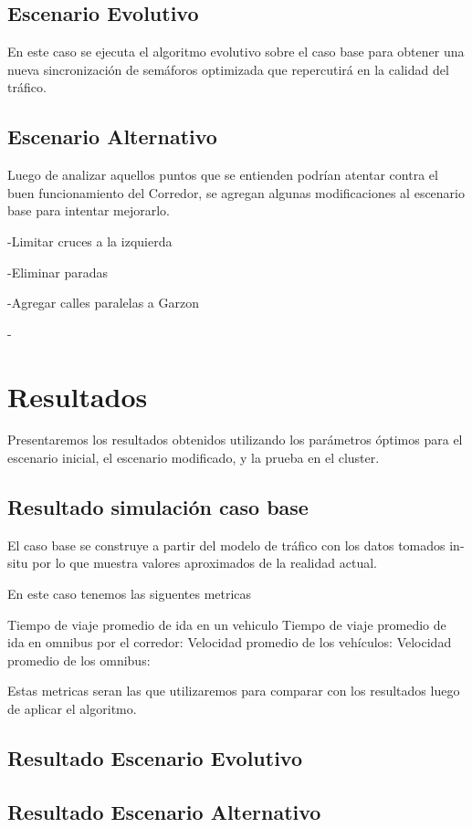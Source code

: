 \subsection{Escenario Evolutivo }
En este caso se ejecuta el algoritmo evolutivo sobre el caso base para obtener una nueva sincronización de semáforos optimizada que repercutirá en la calidad del tráfico.

\subsection{Escenario Alternativo}
Luego de analizar aquellos puntos que se entienden podrían atentar contra el buen funcionamiento del Corredor, se agregan algunas modificaciones al escenario base para intentar mejorarlo. 

-Limitar cruces a la izquierda

-Eliminar paradas

-Agregar calles paralelas a Garzon

-


\section{Resultados}
Presentaremos los resultados obtenidos  utilizando los parámetros óptimos  para el escenario inicial, el escenario modificado, y la prueba en el cluster.

\subsection{Resultado simulación caso base}
El caso base se construye a partir del modelo de tráfico con los datos tomados in-situ por lo que muestra valores aproximados de la realidad actual.

En este caso tenemos las siguentes metricas

Tiempo de viaje promedio de ida en un vehiculo
Tiempo de viaje promedio de ida en omnibus por el corredor:
Velocidad promedio de los vehículos:
Velocidad promedio de los omnibus:

Estas metricas seran las que utilizaremos para comparar con los resultados luego de aplicar el algoritmo.

\subsection{Resultado Escenario Evolutivo}
\subsection{Resultado Escenario Alternativo}

